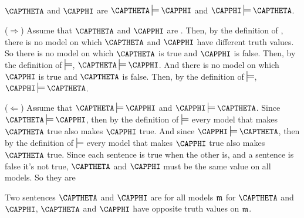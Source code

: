 \begin{THEOREM}{}
$\CAPTHETA$ and $\CAPPHI$ are  \Iff $\CAPTHETA\sdtstile{}{}\CAPPHI$ and $\CAPPHI\sdtstile{}{}\CAPTHETA$.
\begin{PROOF}
	($\Rightarrow$) Assume that $\CAPTHETA$ and $\CAPPHI$ are .
	Then, by the definition of , there is no model on which $\CAPTHETA$ and $\CAPPHI$ have different truth values.
	So there is no model on which $\CAPTHETA$ is true and $\CAPPHI$ is false.
	Then, by the definition of $\entails$, $\CAPTHETA\entails\CAPPHI$.
	And there is no model on which $\CAPPHI$ is true and $\CAPTHETA$ is false.
	Then, by the definition of $\entails$, $\CAPPHI\entails\CAPTHETA$.

	($\Leftarrow$) Assume that $\CAPTHETA\sdtstile{}{}\CAPPHI$ and $\CAPPHI\sdtstile{}{}\CAPTHETA$.
	Since $\CAPTHETA\sdtstile{}{}\CAPPHI$, then by the definition of $\entails$ every model that makes $\CAPTHETA$ true also makes $\CAPPHI$ true.
	And since $\CAPPHI\sdtstile{}{}\CAPTHETA$, then by the definition of $\entails$ every model that makes $\CAPPHI$ true also makes $\CAPTHETA$ true.
	Since each sentence is true when the other is, and a sentence is false \Iff it's not true, $\CAPTHETA$ and $\CAPPHI$ must be the same value on all models.
	So they are 
\end{PROOF}
\end{THEOREM}

\begin{majorILnc}{}
Two sentences $\CAPTHETA$ and $\CAPPHI$ are  \Iff for all models $\mathfrak{m}$ for $\CAPTHETA$ and $\CAPPHI$, $\CAPTHETA$ and $\CAPPHI$ have opposite truth values on $\mathfrak{m}$.
\end{majorILnc}

